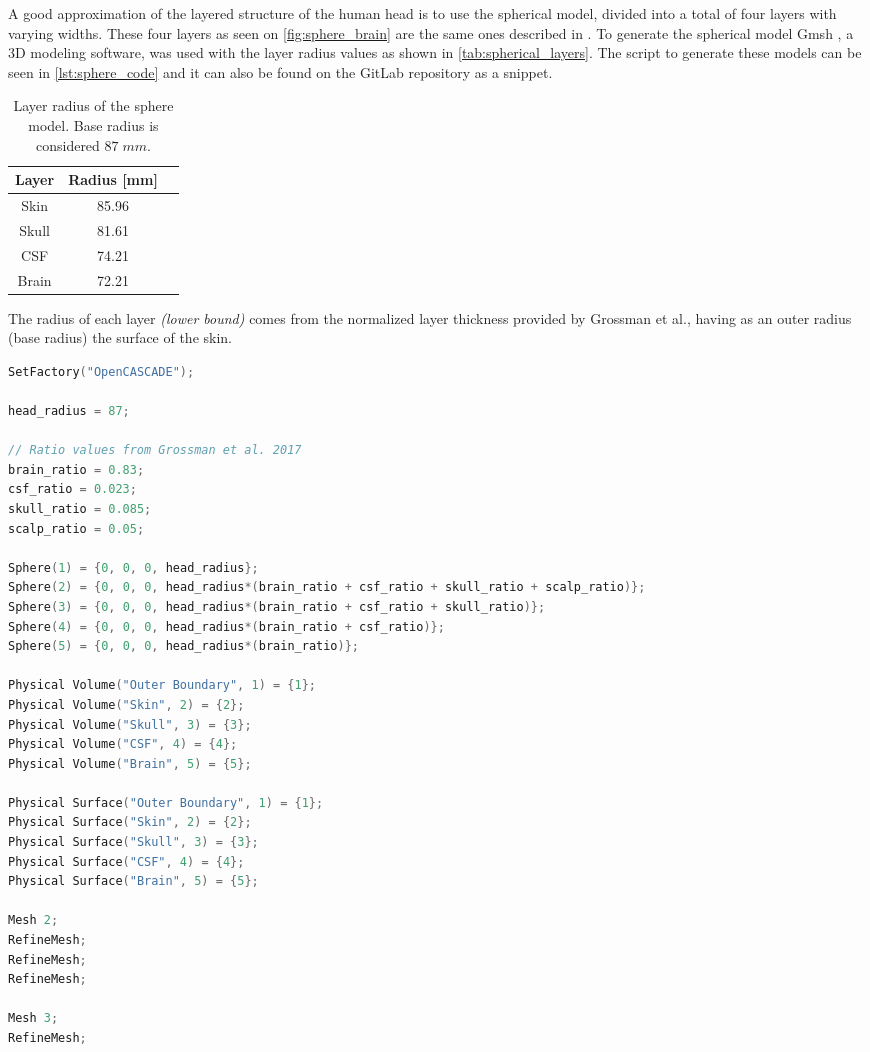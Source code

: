 A good approximation of the layered structure of the human head is to use the spherical model, divided into a total of four layers with varying widths. These four layers as seen on \autoref{fig:sphere_brain} are the same ones described in . To generate the spherical model Gmsh \cite{gmsh}, a 3D modeling software, was used with the layer radius values as shown in \autoref{tab:spherical_layers}. The script to generate these models can be seen in \autoref{lst:sphere_code} and it can also be found on the GitLab repository \cite{thesis_repo} as a snippet.
\begin{table}[!ht]
\begin{minipage}{.62\linewidth}
\centering
\caption{Layer radius of the sphere model. Base radius is considered $87\;\si{mm}$.}
\label{tab:spherical_layers}
\begin{tabular}{|c|c|c|}
\hline
\rowcolor[HTML]{C0C0C0} 
{\color[HTML]{000000} \textbf{Layer}} & {\color[HTML]{000000} \textbf{Radius {[}mm{]}}} \\ \hline
Skin & 85.96 \\ \hline
Skull & 81.61 \\ \hline
CSF & 74.21 \\ \hline
Brain & 72.21 \\ \hline
\end{tabular}
\end{minipage}
\end{table}

\noindent The radius of each layer \textit{(lower bound)} comes from the normalized layer thickness provided by Grossman et al.\cite[Figure S2, J and K]{Grossman2017}, having as an outer radius (base radius) the surface of the skin.

\begin{lstlisting}[language=C,caption={Sphere \gls{CAD} model generation code in \texttt{geo} format},captionpos=b, label=lst:sphere_code]
SetFactory("OpenCASCADE");

head_radius = 87;

// Ratio values from Grossman et al. 2017
brain_ratio = 0.83;
csf_ratio = 0.023;
skull_ratio = 0.085;
scalp_ratio = 0.05;

Sphere(1) = {0, 0, 0, head_radius};
Sphere(2) = {0, 0, 0, head_radius*(brain_ratio + csf_ratio + skull_ratio + scalp_ratio)};
Sphere(3) = {0, 0, 0, head_radius*(brain_ratio + csf_ratio + skull_ratio)};
Sphere(4) = {0, 0, 0, head_radius*(brain_ratio + csf_ratio)};
Sphere(5) = {0, 0, 0, head_radius*(brain_ratio)};

Physical Volume("Outer Boundary", 1) = {1};
Physical Volume("Skin", 2) = {2};
Physical Volume("Skull", 3) = {3};
Physical Volume("CSF", 4) = {4};
Physical Volume("Brain", 5) = {5};

Physical Surface("Outer Boundary", 1) = {1};
Physical Surface("Skin", 2) = {2};
Physical Surface("Skull", 3) = {3};
Physical Surface("CSF", 4) = {4};
Physical Surface("Brain", 5) = {5};

Mesh 2;
RefineMesh;
RefineMesh;
RefineMesh;

Mesh 3;
RefineMesh;
\end{lstlisting}

